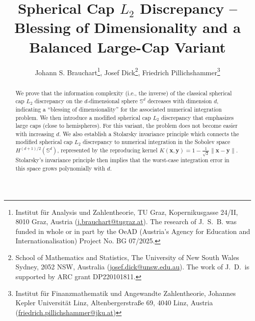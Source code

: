 \documentclass[12pt]{article}
\title{Spherical Cap $L_2$ Discrepancy -- Blessing of Dimensionality and a Balanced Large-Cap Variant}
\author{Johann S. Brauchart\thanks{Institut für Analysis und Zahlentheorie, TU Graz, Kopernikusgasse 24/II, 8010 Graz, Austria (\url{j.brauchart@tugraz.at}). The research of J.~S.~B. was funded in whole or in part by the OeAD (Austria's Agency for Education and Internationalisation) Project No. BG 07/2025. }, Josef Dick\thanks{School of Mathematics and Statistics, The University of New South Wales Sydney, 2052 NSW, Australia (\url{josef.dick@unsw.edu.au}). The work of J.~D.\ is supported by ARC grant DP220101811.}, Friedrich Pillichshammer\thanks{Institut für Finanzmathematik und Angewandte Zahlentheorie, Johannes Kepler Universität Linz, Altenbergerstra{\ss}e 69, 4040 Linz, Austria (\url{friedrich.pillichshammer@jku.at})}}
\date{}
\newcommand{\josi}[1]{{\color{orange}{#1}}}
\begin{document}
\maketitle

\begin{abstract}

We prove that the information complexity (i.e., the inverse) of the classical spherical cap $L_2$ discrepancy on the $d$-dimensional sphere $\mathbb{S}^d$ decreases with dimension $d$, indicating a ``blessing of dimensionality'' for the associated numerical integration problem. We then introduce a modified spherical cap $L_2$ discrepancy that emphasizes large caps (close to hemispheres). For this variant, the problem does not become easier with increasing $d$. We also establish a Stolarsky invariance principle which connects the modified spherical cap $L_2$ discrepancy to numerical integration in the Sobolev space $H^{(d+1)/2}(\mathbb{S}^d)$, represented by the reproducing kernel $K(\bm{x}, \bm{y}) = 1 - \tfrac{1}{\sqrt{2}} \|\bm{x} - \bm{y}\|$. Stolarsky's invariance principle then implies that the worst-case integration error in this space grows polynomially with $d$. %
\end{abstract}
\end{document}
